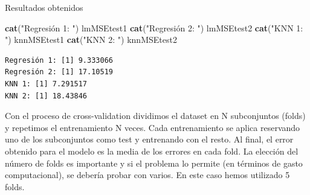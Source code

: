\documentclass[
]{article}
\newenvironment{Shaded}{\begin{snugshade}}{\end{snugshade}}
\newcommand{\CommentTok}[1]{\textcolor[rgb]{0.56,0.35,0.01}{\textit{#1}}}
\newcommand{\ControlFlowTok}[1]{\textcolor[rgb]{0.13,0.29,0.53}{\textbf{#1}}}
\newcommand{\DecValTok}[1]{\textcolor[rgb]{0.00,0.00,0.81}{#1}}
\newcommand{\KeywordTok}[1]{\textcolor[rgb]{0.13,0.29,0.53}{\textbf{#1}}}
\newcommand{\NormalTok}[1]{#1}
\newcommand{\OperatorTok}[1]{\textcolor[rgb]{0.81,0.36,0.00}{\textbf{#1}}}
\newcommand{\StringTok}[1]{\textcolor[rgb]{0.31,0.60,0.02}{#1}}
\begin{document}
\begin{Shaded}
\end{Shaded}

Resultados obtenidos

\begin{Shaded}
\begin{Highlighting}[]
\KeywordTok{cat}\NormalTok{(}\StringTok{"Regresión 1: "}\NormalTok{)}
\NormalTok{lmMSEtest1}
\KeywordTok{cat}\NormalTok{(}\StringTok{"Regresión 2: "}\NormalTok{)}
\NormalTok{lmMSEtest2}
\KeywordTok{cat}\NormalTok{(}\StringTok{"KNN 1: "}\NormalTok{)}
\NormalTok{knnMSEtest1}
\KeywordTok{cat}\NormalTok{(}\StringTok{"KNN 2: "}\NormalTok{)}
\NormalTok{knnMSEtest2}
\end{Highlighting}
\end{Shaded}

\begin{verbatim}
Regresión 1: [1] 9.333066
Regresión 2: [1] 17.10519
KNN 1: [1] 7.291517
KNN 2: [1] 18.43846
\end{verbatim}

Con el proceso de cross-validation dividimos el dataset en N
subconjuntos (folds) y repetimos el entrenamiento N veces. Cada
entrenamiento se aplica reservando uno de los subconjuntos como test y
entrenando con el resto. Al final, el error obtenido para el modelo es
la media de los errores en cada fold. La elección del número de folds es
importante y si el problema lo permite (en términos de gasto
computacional), se debería probar con varios. En este caso hemos
utilizado 5 folds.
\end{document}
